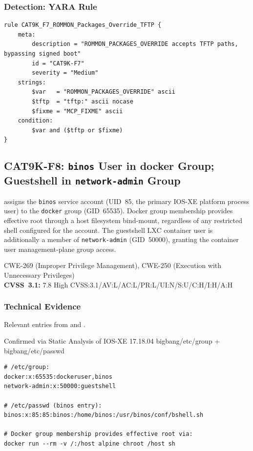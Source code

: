 \documentclass[11pt,a4paper]{article}
\begin{document}
\subsubsection{Detection: YARA Rule}

\begin{lstlisting}[style=yara]
rule CAT9K_F7_ROMMON_Packages_Override_TFTP {
    meta:
        description = "ROMMON_PACKAGES_OVERRIDE accepts TFTP paths, bypassing signed boot"
        id = "CAT9K-F7"
        severity = "Medium"
    strings:
        $var   = "ROMMON_PACKAGES_OVERRIDE" ascii
        $tftp  = "tftp:" ascii nocase
        $fixme = "MCP_FIXME" ascii
    condition:
        $var and ($tftp or $fixme)
}
\end{lstlisting}

\subsection{CAT9K-F8: \texorpdfstring{\texttt{binos}}{binos} User in docker Group; Guestshell in \texorpdfstring{\texttt{network-admin}}{network-admin} Group}

\begin{overviewbox}
 assigns the \texttt{binos} service account (UID~85, the
primary IOS-XE platform process user) to the \texttt{docker} group (GID~65535).
Docker group membership provides effective root through a host filesystem bind-mount,
regardless of any restricted shell configured for the account. The guestshell LXC
container user is additionally a member of \texttt{network-admin} (GID~50000),
granting the container user management-plane group access.

CWE-269 (Improper Privilege Management), CWE-250 (Execution with Unnecessary Privileges)\\
\textbf{CVSS~3.1:} 7.8 High \quad CVSS:3.1/AV:L/AC:L/PR:L/UI:N/S:U/C:H/I:H/A:H
\end{overviewbox}

\subsubsection{Technical Evidence}

Relevant entries from  and .

\begin{pocbox}{Confirmed via Static Analysis of IOS-XE 17.18.04 bigbang/etc/group + bigbang/etc/passwd}
\begin{lstlisting}
# /etc/group:
docker:x:65535:dockeruser,binos
network-admin:x:50000:guestshell

# /etc/passwd (binos entry):
binos:x:85:85:binos:/home/binos:/usr/binos/conf/bshell.sh

# Docker group membership provides effective root via:
docker run --rm -v /:/host alpine chroot /host sh
\end{lstlisting}
\end{pocbox}
\end{document}
